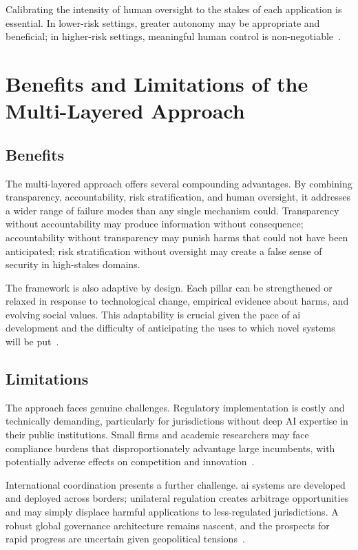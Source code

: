 \documentclass[11pt,showkeys]{essay}
\begin{document}
Calibrating the intensity of human oversight to the stakes of each application is essential. In lower-risk settings, greater autonomy may be appropriate and beneficial; in higher-risk settings, meaningful human control is non-negotiable~\cite{calo_artificial_2017}.

\section{Benefits and Limitations of the Multi-Layered Approach}

\subsection{Benefits}

The multi-layered approach offers several compounding advantages. By combining transparency, accountability, risk stratification, and human oversight, it addresses a wider range of failure modes than any single mechanism could. Transparency without accountability may produce information without consequence; accountability without transparency may punish harms that could not have been anticipated; risk stratification without oversight may create a false sense of security in high-stakes domains.

The framework is also adaptive by design. Each pillar can be strengthened or relaxed in response to technological change, empirical evidence about harms, and evolving social values. This adaptability is crucial given the pace of \gls{ai} development and the difficulty of anticipating the uses to which novel systems will be put~\cite{dafoe_ai_2018}.

\subsection{Limitations}

The approach faces genuine challenges. Regulatory implementation is costly and technically demanding, particularly for jurisdictions without deep AI expertise in their public institutions. Small firms and academic researchers may face compliance burdens that disproportionately advantage large incumbents, with potentially adverse effects on competition and innovation~\cite{calo_artificial_2017}.

International coordination presents a further challenge. \gls{ai} systems are developed and deployed across borders; unilateral regulation creates arbitrage opportunities and may simply displace harmful applications to less-regulated jurisdictions. A robust global governance architecture remains nascent, and the prospects for rapid progress are uncertain given geopolitical tensions~\cite{jobin_global_2019}.
\end{document}
